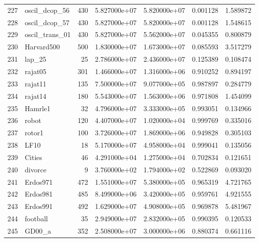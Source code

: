 \begin{tabular}{llrrrrr}
227 &            oscil\_dcop\_56 &   430 &  5.827000e+07 &  5.820000e+07 &  0.001128 &   1.589872 \\
228 &            oscil\_dcop\_57 &   430 &  5.827000e+07 &  5.820000e+07 &  0.001128 &   1.548615 \\
229 &           oscil\_trans\_01 &   430 &  5.827000e+07 &  5.562000e+07 &  0.045355 &   0.800879 \\
230 &               Harvard500 &   500 &  1.830000e+07 &  1.673000e+07 &  0.085593 &   3.517279 \\
231 &                   lap\_25 &    25 &  2.786000e+07 &  2.436000e+07 &  0.125389 &   0.108474 \\
232 &                  rajat05 &   301 &  1.466000e+07 &  1.316000e+06 &  0.910252 &   0.894197 \\
233 &                  rajat11 &   135 &  7.500000e+07 &  9.077000e+05 &  0.987897 &   0.284779 \\
234 &                  rajat14 &   180 &  5.543000e+07 &  1.563000e+06 &  0.971808 &   1.454099 \\
235 &                  Hamrle1 &    32 &  4.796000e+07 &  3.333000e+05 &  0.993051 &   0.134966 \\
236 &                    robot &   120 &  4.407000e+07 &  1.020000e+04 &  0.999769 &   0.335016 \\
237 &                   rotor1 &   100 &  3.726000e+07 &  1.869000e+06 &  0.949828 &   0.305103 \\
238 &                     LF10 &    18 &  5.170000e+07 &  4.958000e+04 &  0.999041 &   0.135056 \\
239 &                   Cities &    46 &  4.291000e+04 &  1.275000e+04 &  0.702834 &   0.121651 \\
240 &                  divorce &     9 &  3.760000e+02 &  1.794000e+02 &  0.522869 &   0.093020 \\
241 &                 Erdos971 &   472 &  1.551000e+07 &  5.380000e+05 &  0.965319 &   4.721765 \\
242 &                 Erdos981 &   485 &  8.499000e+06 &  3.420000e+05 &  0.959761 &   4.921555 \\
243 &                 Erdos991 &   492 &  1.629000e+07 &  4.908000e+05 &  0.969878 &   5.481967 \\
244 &                 football &    35 &  2.949000e+07 &  2.832000e+05 &  0.990395 &   0.120533 \\
245 &                   GD00\_a &   352 &  2.508000e+07 &  3.000000e+06 &  0.880374 &   0.661116 \\

\end{tabular}
